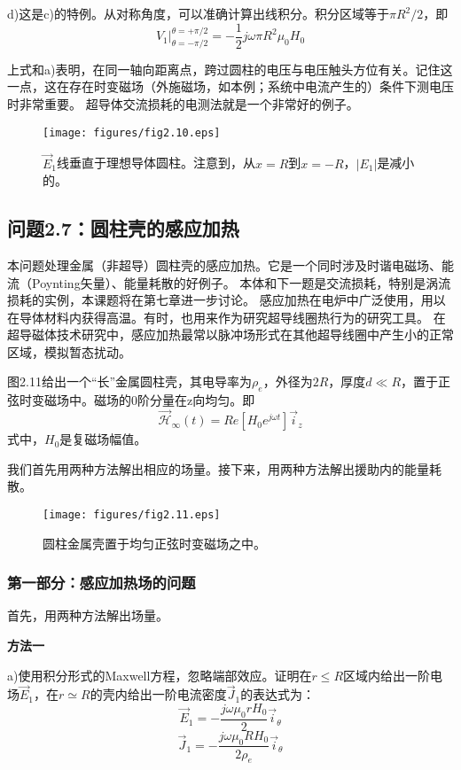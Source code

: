 d)这是c)的特例。从对称角度，可以准确计算出线积分。积分区域等于$\pi R^2/2$，即
$$V_1 |_{\theta=-\pi/2}^{\theta=+\pi/2}=-\frac{1}{2}j\omega \pi R^2 \mu_0 H_0$$

上式和a)表明，在同一轴向距离点，跨过圆柱的电压与电压触头方位有关。记住这一点，这在存在时变磁场（外施磁场，如本例；系统中电流产生的）条件下测电压时非常重要。
超导体交流损耗的电测法就是一个非常好的例子。

\begin{figure}
  \centering
 \texttt{[image: figures/fig2.10.eps]}
  \caption{$\vec{E}_1$线垂直于理想导体圆柱。注意到，从$x=R$到$x=-R$，$|E_1|$是减小的。}
\end{figure}


\subsection{问题2.7：圆柱壳的感应加热}
本问题处理金属（非超导）圆柱壳的感应加热。它是一个同时涉及时谐电磁场、能流（Poynting矢量）、能量耗散的好例子。
本体和下一题是交流损耗，特别是涡流损耗的实例，本课题将在第七章进一步讨论。
感应加热在电炉中广泛使用，用以在导体材料内获得高温。有时，也用来作为研究超导线圈热行为的研究工具。
在超导磁体技术研究中，感应加热最常以脉冲场形式在其他超导线圈中产生小的正常区域，模拟暂态扰动。

图2.11给出一个“长”金属圆柱壳，其电导率为$\rho_e$，外径为$2R$，厚度$d\ll R$，置于正弦时变磁场中。磁场的0阶分量在z向均匀。即
$$\vec{\mathcal{H}}_\infty(t)=Re[H_0 e^{j\omega t}] \vec{i}_z$$
式中，$H_0$是复磁场幅值。

我们首先用两种方法解出相应的场量。接下来，用两种方法解出援助内的能量耗散。

\begin{figure}
  \centering
 \texttt{[image: figures/fig2.11.eps]}
  \caption{圆柱金属壳置于均匀正弦时变磁场之中。}
\end{figure}

\subsubsection*{第一部分：感应加热场的问题}
首先，用两种方法解出场量。

\textbf{方法一}

a)使用积分形式的Maxwell方程，忽略端部效应。证明在$r\le R$区域内给出一阶电场$\vec{E}_1$，在$r\simeq R$的壳内给出一阶电流密度$\vec{J}_1$的表达式为：
$$\vec{E}_1=-\frac{j\omega \mu_0 r H_0}{2} \vec{i}_\theta$$
$$\vec{J}_1=-\frac{j\omega \mu_0 R H_0}{2\rho_e} \vec{i}_\theta$$

